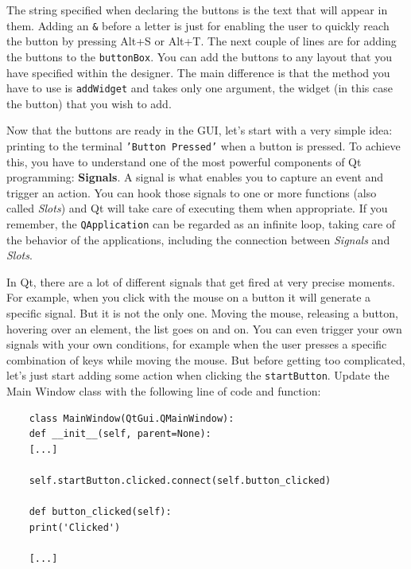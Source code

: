 The string specified when declaring the buttons is the text that will
appear in them. Adding an \texttt{\&} before a letter is just for
enabling the user to quickly reach the button by pressing Alt+S or Alt+T.
The next couple of lines are for adding the buttons to the
\texttt{buttonBox}. You can add the buttons to any layout that you have
specified within the designer. The main difference is that the method
you have to use is \texttt{addWidget} and takes only one argument, the
widget (in this case the button) that you wish to add.


Now that the buttons are ready in the {GUI}, let's start with a very
simple idea: printing to the terminal \texttt{'Button Pressed'} when a button
is pressed. To achieve this, you have to understand one of the most
powerful components of Qt programming: \textbf{Signals}. A signal is
what enables you to capture an event and trigger an action. You can hook
those signals to one or more functions (also called \emph{Slots}) and Qt
will take care of executing them when appropriate. If you remember, the
\texttt{QApplication} can be regarded as an infinite loop, taking care
of the behavior of the applications, including the connection between
\emph{Signals} and \emph{Slots}.

In Qt, there are a lot of different signals that get fired at very
precise moments. For example, when you click with the mouse on a button
it will generate a specific signal. But it is not the only one. Moving
the mouse, releasing a button, hovering over an element, the list goes
on and on. You can even trigger your own signals with your own
conditions, for example when the user presses a specific combination of
keys while moving the mouse. But before getting too complicated, let's
just start adding some action when clicking the \texttt{startButton}.
Update the Main Window class with the following line of code and
function:

\begin{verbatim}
    class MainWindow(QtGui.QMainWindow):
    def __init__(self, parent=None):
    [...]

    self.startButton.clicked.connect(self.button_clicked)

    def button_clicked(self):
    print('Clicked')

    [...]
\end{verbatim}

